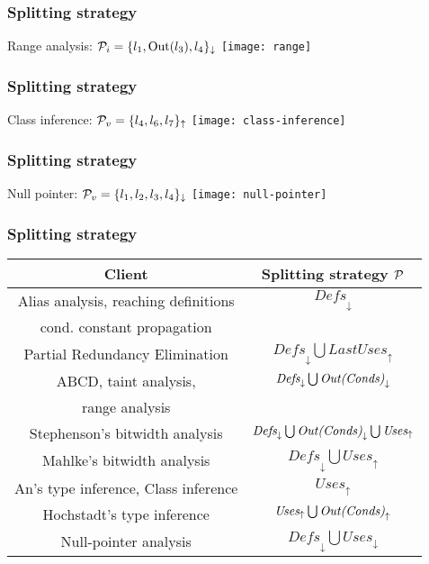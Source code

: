 \begin{frame}
\frametitle{Splitting strategy}
\begin{block}{Range analysis: ${\cal P}_{i} = \{l_1, \textrm{Out}(l_3), l_4\}_\downarrow$}
\texttt{[image: range]} 
\end{block}
\vfill
\end{frame}

\begin{frame}
\frametitle{Splitting strategy}
\begin{block}{Class inference: ${\cal P}_{v} = \{l_4, l_6,l_7\}_\uparrow$}
\texttt{[image: class-inference]} 
\end{block}
\vfill
\end{frame}

\begin{frame}
\frametitle{Splitting strategy}
\begin{block}{Null pointer: ${\cal P}_{v} = \{l_1, l_2, l_3, l_4\}_\downarrow$}
\texttt{[image: null-pointer]} 
\end{block}
\vfill
\end{frame}

\begin{frame}
\frametitle{Splitting strategy}
\begin{small}
\renewcommand\arraystretch{1.4}
\begin{tabular}{| c | c |} \hline
{\bf Client} & {\bf Splitting strategy ${\cal P}$} \\ \hline 
Alias analysis, reaching definitions & $\textit{Defs}_\downarrow$ \\ 
cond. constant propagation &  \\ \hline  
Partial Redundancy Elimination & $\textit{Defs}_\downarrow \bigcup \textit{LastUses}_\uparrow$ \\ \hline 
ABCD, taint analysis,  & $\textit{Defs}_\downarrow \bigcup \textit{\textrm{Out}(Conds)}_\downarrow$ \\ 
range analysis & \\ \hline 
Stephenson's bitwidth analysis & $\textit{Defs}_\downarrow \bigcup \textit{\textrm{Out}(Conds)}_\downarrow \bigcup \textit{Uses}_\uparrow$  \\ \hline 
Mahlke's bitwidth analysis & $\textit{Defs}_\downarrow \bigcup \textit{Uses}_\uparrow$  \\ \hline 
An's type inference, Class inference & $\textit{Uses}_\uparrow$ \\ \hline 
Hochstadt's type inference & $\textit{Uses}_\uparrow \bigcup \textit{\textrm{Out}(Conds)}_\uparrow$ \\ \hline 
Null-pointer analysis & $\textit{Defs}_\downarrow \bigcup\textit{Uses}_\downarrow$ \\ \hline
\end{tabular} \end{small}
\end{frame}

